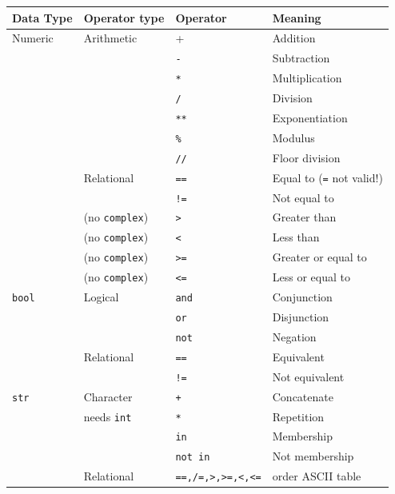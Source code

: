 \begin{table}[!h]
    \centering
    \begin{tabular}{|l|l|l|l|}
        \hline
        Data Type  & Operator type & Operator & Meaning \\ \hline
        Numeric & Arithmetic & + & Addition \\ 
        ~ & ~ & \texttt{-} & Subtraction \\ 
        ~ & ~ & \texttt{*} & Multiplication \\ 
        ~ & ~ & \texttt{/} & Division \\ 
        ~ & ~ & \texttt{**} & Exponentiation \\ 
        ~ & ~ & \texttt{\%} & Modulus \\
        ~ & ~ & \texttt{//} & Floor division \\
        ~ & Relational & \texttt{==}   & Equal to (\texttt{=} not valid!) \\ 
        ~ & ~ & \texttt{!=}  & Not equal to \\ 
        ~ & {\footnotesize (no \texttt{complex})} & \texttt{>}  & Greater than  \\ 
        ~ & {\footnotesize (no \texttt{complex})} & \texttt{<}  & Less than \\ 
        ~ & {\footnotesize (no \texttt{complex})} & \texttt{>=}  & Greater or equal to \\ 
        ~ & {\footnotesize (no \texttt{complex})} & \texttt{<=}   & Less or equal to  \\ \hline
        \texttt{bool} & Logical & \texttt{and} & Conjunction \\ 
        ~ & ~ & \texttt{or} & Disjunction \\ 
        ~ & ~ & \texttt{not} & Negation \\  
        ~ & Relational &\texttt{==} & Equivalent \\ 
        ~ & ~ & \texttt{!=}  & Not equivalent \\ \hline
        \texttt{str} & Character & \texttt{+} & Concatenate \\ 
        ~ & {\footnotesize needs \texttt{int}} & \texttt{*} & Repetition \\ 
        ~ & ~ & \texttt{in} & Membership \\
        ~ & ~ & \texttt{not in} & Not membership \\
        ~ & Relational & \texttt{==,/=,>,>=,<,<=} & order ASCII table \\ \hline
    \end{tabular}
\end{table}



